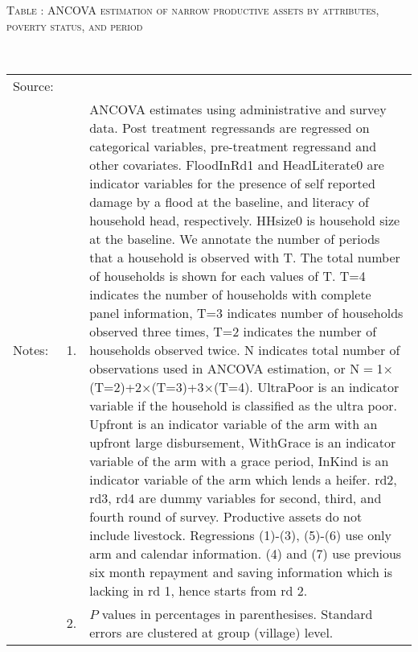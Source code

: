 \hspace{-1cm}\begin{minipage}[t]{14cm}
\hfil\textsc{\normalsize Table \thetable: ANCOVA estimation of narrow productive assets by attributes, poverty status, and period\label{tab ANCOVA narrow productive assets timevarying poverty status attributes}}\\
\setlength{\tabcolsep}{1pt}
\setlength{\baselineskip}{8pt}
\renewcommand{\arraystretch}{.55}
\hfil{}\\
\renewcommand{\arraystretch}{.8}
\setlength{\tabcolsep}{1pt}
\begin{tabular}{>{\hfill\scriptsize}p{1cm}<{}>{\hfill\scriptsize}p{.25cm}<{}>{\scriptsize}p{12cm}<{\hfill}}
Source:& \multicolumn{2}{l}{\scriptsize Estimated with GUK administrative and survey data.}\\
Notes: & 1. & ANCOVA estimates using administrative and survey data. Post treatment regressands are regressed on categorical variables, pre-treatment regressand and other covariates. \textsf{FloodInRd1} and \textsf{HeadLiterate0} are indicator variables for the presence of self reported damage by a flood at the baseline, and literacy of household head, respectively. \textsf{HHsize0} is household size at the baseline. We annotate the number of periods that a household is observed with \textsf{T}. The total number of households is shown for each values of \textsf{T}. \textsf{T=4} indicates the number of households with complete panel information, \textsf{T=3} indicates number of households observed three times, \textsf{T=2} indicates the number of households observed twice. \textsf{N} indicates total number of observations used in ANCOVA estimation, or \textsf{N$=$1$\times$(T=2)+2$\times$(T=3)+3$\times$(T=4)}.  \textsf{UltraPoor} is an indicator variable if the household is classified as the ultra poor. \textsf{Upfront} is an indicator variable of the arm with an upfront large disbursement, \textsf{WithGrace} is an indicator variable of the arm with a grace period, \textsf{InKind} is an indicator variable of the arm which lends a heifer. \textsf{rd2, rd3, rd4} are dummy variables for second, third, and fourth round of survey. Productive assets do not include livestock. Regressions (1)-(3), (5)-(6) use only arm and calendar information. (4) and (7) use previous six month repayment and saving information which is lacking in rd 1, hence starts from rd 2.\\
& 2. & $P$ values in percentages in parenthesises. Standard errors are clustered at group (village) level.
\end{tabular}
\end{minipage}

